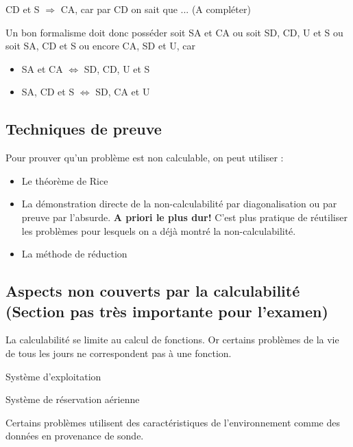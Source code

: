 \begin{myprop}
	CD et S $\Rightarrow$ CA, car par CD on sait que
	 ... (A compléter)
\end{myprop}

Un bon formalisme doit donc posséder soit SA et CA ou soit SD, CD, U et S ou 
soit SA, CD et S ou encore CA, SD et U, car
\begin{itemize}
	\item SA et CA $\iff$ SD, CD, U et S
	\item SA, CD et S $\iff$ SD, CA et U
\end{itemize}

\subsection{Techniques de preuve}
\label{sub:techniques_de_preuve}

Pour prouver qu'un problème est non calculable, on peut utiliser :
\begin{itemize}
	\item Le théorème de Rice
	\item La démonstration directe de la non-calculabilité par 
		diagonalisation ou par preuve par l'absurde. 
		\textbf{A priori le plus dur!} C'est plus pratique de réutiliser les problèmes pour 
		lesquels on a déjà montré la non-calculabilité.
	\item La méthode de réduction
\end{itemize}

\subsection{Aspects non couverts par la calculabilité\\ (Section pas très
	importante pour l'examen)}
\label{sub:aspects_non_couvert_par_la_calculabilit_}
La calculabilité se limite au calcul de fonctions. Or certains problèmes de la vie 
de tous les jours ne correspondent pas à une fonction.

\begin{myexem}
	Système d'exploitation
\end{myexem}

\begin{myexem}
	Système de réservation aérienne
\end{myexem}

\begin{myexem}
	Certains problèmes utilisent des caractéristiques de l'environnement comme 
	des données en provenance de sonde.
\end{myexem}

